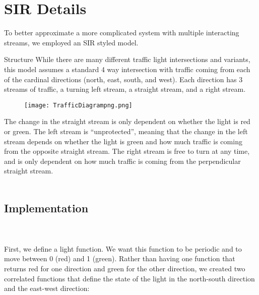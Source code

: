 \documentclass[12pt]{article}
\begin{document}

\section{SIR Details}
To better approximate a more complicated system with multiple interacting streams, we employed an SIR styled model. 

Structure
While there are many different traffic light intersections and variants, this model assumes a standard 4 way intersection with traffic coming from each of the cardinal directions (north, east, south, and west). Each direction has 3 streams of traffic, a turning left stream, a straight stream, and a right stream. 

\begin{figure}[htp]
    \centering
    \texttt{[image: TrafficDiagrampng.png]}
    \label{fig:diagram}
\end{figure}

The change in the straight stream is only dependent on whether the light is red or green. The left stream is “unprotected”, meaning that the change in the left stream depends on whether the light is green and how much traffic is coming from the opposite straight stream. The right stream is free to turn at any time, and is only dependent on how much traffic is coming from the perpendicular straight stream.
\\\\
\subsection{Implementation}
\\\\
First, we define a light function. We want this function to be periodic and to move between 0 (red) and 1 (green). Rather than having one function that returns red for one direction and green for the other direction, we created two correlated functions that define the state of the light in the north-south direction and the east-west direction:
\end{document}
